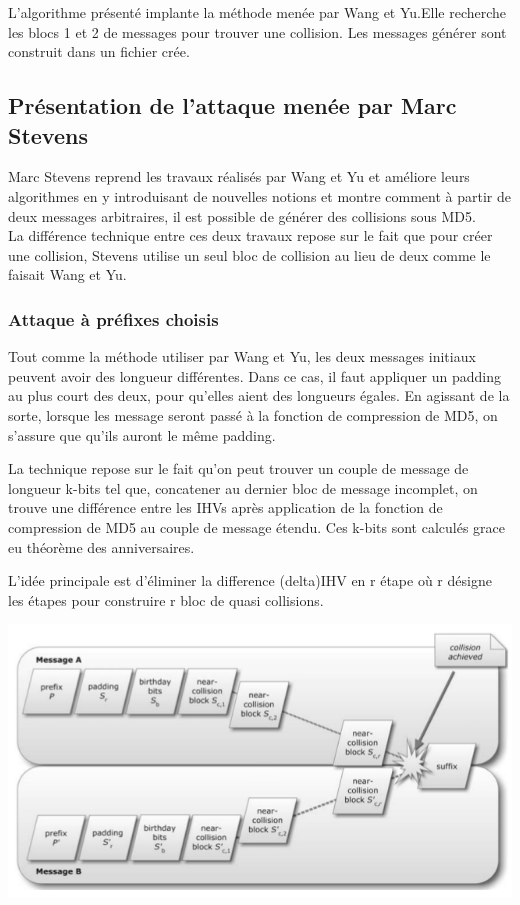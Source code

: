 \documentclass[a4paper,11pt,french]{article}
\begin{document}
L'algorithme présenté implante la méthode menée par Wang et Yu.Elle recherche les blocs 1 et 2 de messages pour trouver une collision. Les messages générer sont construit dans un fichier crée.

\subsection{Présentation de l'attaque menée par Marc Stevens}
Marc Stevens reprend les travaux réalisés par Wang et Yu et améliore leurs algorithmes en y introduisant de nouvelles notions et montre comment à partir de deux messages arbitraires, il est possible de générer des collisions sous MD5.\\

La différence technique entre ces deux travaux repose sur le fait que pour créer une collision, Stevens utilise un seul bloc de collision au lieu de deux comme le faisait Wang et Yu. 

\subsubsection{Attaque à préfixes choisis}
Tout comme la méthode utiliser par Wang et Yu, les deux messages initiaux peuvent avoir des longueur différentes. Dans ce cas, il faut appliquer un padding au plus court des deux, pour qu'elles aient des longueurs égales. En agissant de la sorte, lorsque les message seront passé à la fonction de compression de MD5, on s'assure que qu'ils auront le même padding.

La technique repose sur le fait qu'on peut trouver un couple de message de longueur k-bits tel que, concatener au dernier bloc de message incomplet, on trouve une différence entre les IHVs après application de la fonction de compression de MD5 au couple de message étendu. Ces k-bits sont calculés grace eu théorème des anniversaires.

L'idée principale est d'éliminer la difference (delta)IHV en r étape où r désigne les étapes pour construire r bloc de quasi collisions.

\includegraphics[scale=.61]{./pics/col.png}
\end{document}
